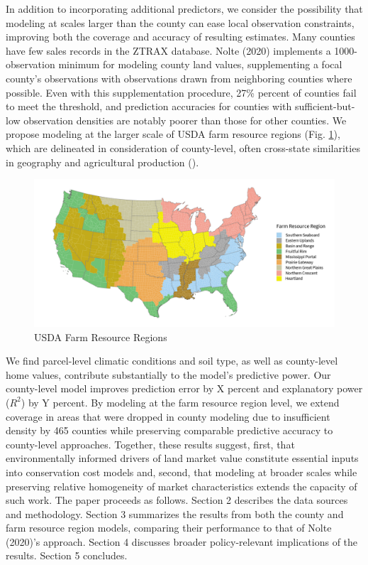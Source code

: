 \documentclass[12pt]{article}
\begin{document}
In addition to incorporating additional predictors, we consider the possibility that modeling at scales larger than the county can ease local observation constraints, improving both the coverage and accuracy of resulting estimates. Many counties have few sales records in the ZTRAX database. Nolte (2020) implements a 1000-observation minimum for modeling county land values, supplementing a focal county’s observations with observations drawn from neighboring counties where possible. Even with this supplementation procedure, 27\% percent of counties fail to meet the threshold, and prediction accuracies for counties with sufficient-but-low observation densities are notably poorer than those for other counties. We propose modeling at the larger scale of USDA farm resource regions (Fig. \ref{fig:FRR_map}), which are delineated in consideration of county-level, often cross-state similarities in geography and agricultural production (\cite{FRR2000}).

\begin{figure}
    \centering
    \includegraphics[width=1\textwidth]{exhibits/FRR_map.png}
    \caption{USDA Farm Resource Regions}
    \label{fig:FRR_map}
\end{figure}

We find parcel-level climatic conditions and soil type, as well as county-level home values, contribute substantially to the model's predictive power. Our county-level model improves prediction error by X percent and explanatory power ($R^2$) by Y percent. By modeling at the farm resource region level, we extend coverage in areas that were dropped in county modeling due to insufficient density by 465 counties while preserving comparable predictive accuracy to county-level approaches. Together, these results suggest, first, that environmentally informed drivers of land market value constitute essential inputs into conservation cost models and, second, that modeling at broader scales while preserving relative homogeneity of market characteristics extends the capacity of such work. The paper proceeds as follows. Section 2 describes the data sources and methodology. Section 3 summarizes the results from both the county and farm resource region models, comparing their performance to that of Nolte (2020)'s approach. Section 4 discusses broader policy-relevant implications of the results. Section 5 concludes.
\end{document}
